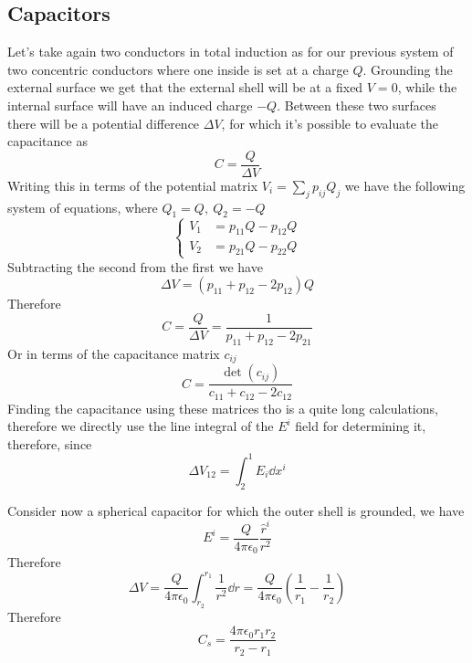 \documentclass[../electromagnetism]{subfiles}
\begin{document}
\subsection{Capacitors}
Let's take again two conductors in total induction as for our previous system of two concentric conductors where one inside is set at a charge $Q$. Grounding the external surface we get that the external shell will be at a fixed $V=0$, while the internal surface will have an induced charge $-Q$. Between these two surfaces there will be a potential difference $\Delta V$, for which it's possible to evaluate the capacitance as
\begin{equation*}
	C=\frac{Q}{\Delta V}
\end{equation*}
Writing this in terms of the potential matrix $V_i=\sum_jp_{ij}Q_j$ we have the following system of equations, where $Q_1=Q,\ Q_2=-Q$
\begin{equation*}
	\left\{ \begin{aligned}
			V_1&=p_{11}Q-p_{12}Q\\
			V_2&=p_{21}Q-p_{22}Q
	\end{aligned}\right.
\end{equation*}
Subtracting the second from the first we have
\begin{equation*}
	\Delta V=\left( p_{11}+p_{12}-2p_{12} \right)Q
\end{equation*}
Therefore
\begin{equation}
	C=\frac{Q}{\Delta V}=\frac{1}{p_{11}+p_{12}-2p_{21}}
	\label{eq:capacitypotentialmatrix}
\end{equation}
Or in terms of the capacitance matrix $c_{ij}$
\begin{equation}
	C=\frac{\det(c_{ij})}{c_{11}+c_{12}-2c_{12}}
	\label{eq:capacitancecapmatrix}
\end{equation}
Finding the capacitance using these matrices tho is a quite long calculations, therefore we directly use the line integral of the $E^i$ field for determining it, therefore, since
\begin{equation*}
	\Delta V_{12}=\int_{2}^{1}E_i\dd x^i
\end{equation*}
\begin{eg}
	Consider now a spherical capacitor for which the outer shell is grounded, we have
	\begin{equation*}
		E^i=\frac{Q}{4\pi\epsilon_0}\frac{\hat{r}^i}{r^2}
	\end{equation*}
	Therefore
	\begin{equation*}
		\Delta V=\frac{Q}{4\pi\epsilon_0}\int_{r_2}^{r_1}\frac{1}{r^2}\dd r=\frac{Q}{4\pi\epsilon_0}\left( \frac{1}{r_1}-\frac{1}{r_2} \right)
	\end{equation*}
	Therefore
	\begin{equation}
		C_s=\frac{4\pi\epsilon_0r_1r_2}{r_2-r_1}
		\label{eq:sphcap}
	\end{equation}
\end{eg}
\end{document}
